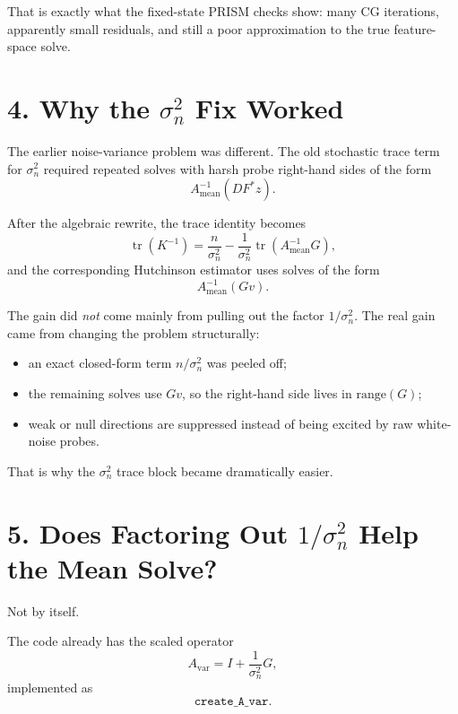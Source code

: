 \documentclass[11pt]{article}
\begin{document}
That is exactly what the fixed-state PRISM checks show: many CG iterations,
apparently small residuals, and still a poor approximation to the true
feature-space solve.

\section*{4. Why the $\sigma_n^2$ Fix Worked}

The earlier noise-variance problem was different. The old stochastic trace term
for $\sigma_n^2$ required repeated solves with harsh probe right-hand sides of
the form
\begin{equation}
A_{\mathrm{mean}}^{-1}(D F^\ast z).
\end{equation}

After the algebraic rewrite, the trace identity becomes
\begin{equation}
\operatorname{tr}(K^{-1})
=
\frac{n}{\sigma_n^2}
-
\frac{1}{\sigma_n^2}
\operatorname{tr}(A_{\mathrm{mean}}^{-1} G),
\end{equation}
and the corresponding Hutchinson estimator uses solves of the form
\begin{equation}
A_{\mathrm{mean}}^{-1}(Gv).
\end{equation}

The gain did \emph{not} come mainly from pulling out the factor
$1/\sigma_n^2$. The real gain came from changing the problem structurally:
\begin{itemize}
  \item an exact closed-form term $n/\sigma_n^2$ was peeled off;
  \item the remaining solves use $Gv$, so the right-hand side lives in
  $\mathrm{range}(G)$;
  \item weak or null directions are suppressed instead of being excited by raw
  white-noise probes.
\end{itemize}

That is why the $\sigma_n^2$ trace block became dramatically easier.

\section*{5. Does Factoring Out $1/\sigma_n^2$ Help the Mean Solve?}

Not by itself.

The code already has the scaled operator
\begin{equation}
A_{\mathrm{var}} = I + \frac{1}{\sigma_n^2} G,
\end{equation}
implemented as
\[
\texttt{create\_A\_var}.
\]
\end{document}
